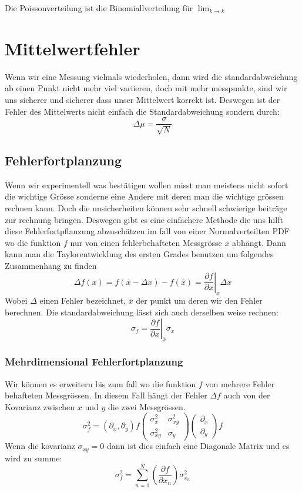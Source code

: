 \documentclass{article}
\begin{document}
Die Poissonverteilung ist die Binomiallverteilung für $\lim_{k\rightarrow k}$
\hypertarget{mittelwertfehler}{\section*{Mittelwertfehler}}
Wenn wir eine Messung vielmals wiederholen, dann wird die standardabweichung ab einen Punkt nicht mehr viel variieren, doch mit mehr messpunkte, sind wir uns sicherer und sicherer dass unser Mittelwert korrekt ist. Deswegen ist der Fehler des Mittelwerts nicht einfach die Standardabweichung sondern durch:
\[\Delta \mu=\frac{\sigma}{\sqrt{N}}\]
\hypertarget{fehlerfortplanzung}{\subsection*{Fehlerfortplanzung}}
Wenn wir experimentell was bestätigen wollen misst man meistens nicht sofort die wichtige Grösse sonderne eine Andere mit
deren man die wichtige grössen rechnen kann. Doch die unsicherheiten können sehr schnell schwierige beiträge zur rechnung bringen.
Deswegen gibt es eine einfachere Methode die uns hilft diese Fehlerfortpflanzung abzuschätzen im fall von einer Normalverteilten PDF
wo die funktion $f$ nur von einen fehlerbehafteten Messgrösse $x$ abhängt. 
Dann kann man die Taylorentwicklung des ersten Grades benutzen um folgendes Zusammenhang zu finden
\[\Delta f(x)=f(\overline{x}-\Delta x)-f(\overline{x})=\left.\frac{\partial f}{\partial x}\right|_{\overline{x}}\Delta x\]
Wobei $\Delta$ einen Fehler bezeichnet, $\overline{x}$ der punkt um deren wir den Fehler berechnen. Die standardabweichung lässt sich auch derselben weise rechnen:
\[\sigma_f=\left.\frac{\partial f}{\partial x}\right|_ {\overline{x}}\sigma_x\]
\hypertarget{mehrdimensionaleFehlerfortpflanzung}{\subsubsection*{Mehrdimensional Fehlerfortplanzung}}
Wir können es erweitern bis zum fall wo die funktion $f$ von mehrere Fehler behafteten Messgrössen. In diesem Fall hängt der
Fehler $\Delta f$ auch von der Kovarianz zwischen $x$ und $y$ die zwei Messgrössen.
\[\sigma_f^2=(\partial_x,\partial_y)f\begin{pmatrix}\sigma_x^2&\sigma_{xy}^2\\\sigma_{xy}^2&\sigma_y\end{pmatrix}\begin{pmatrix}\partial_x\\\partial_y\end{pmatrix}f\]
Wenn die kovarianz $\sigma_{xy}=0$ dann ist dies einfach eine Diagonale Matrix und es wird zu summe:
\[\sigma_f^2=\sum_{n=1}^N\left(\frac{\partial f}{\partial x_n}\right)\sigma_{x_n}^2\]
\end{document}
